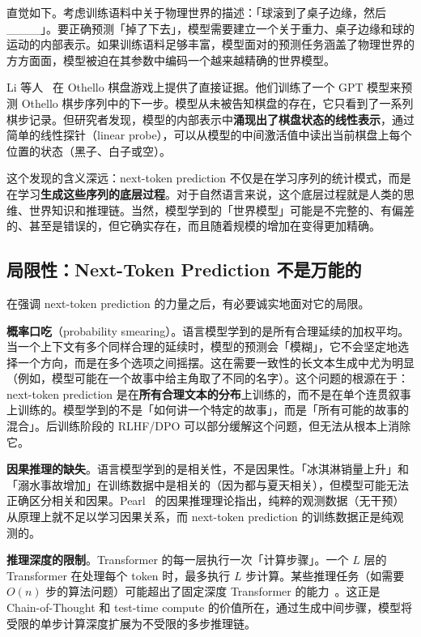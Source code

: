 直觉如下。考虑训练语料中关于物理世界的描述：「球滚到了桌子边缘，然后\_\_\_\_」。要正确预测「掉了下去」，模型需要建立一个关于重力、桌子边缘和球的运动的内部表示。如果训练语料足够丰富，模型面对的预测任务涵盖了物理世界的方方面面，模型被迫在其参数中编码一个越来越精确的世界模型。

Li 等人~\cite{li2023othello} 在 Othello 棋盘游戏上提供了直接证据。他们训练了一个 GPT 模型来预测 Othello 棋步序列中的下一步。模型从未被告知棋盘的存在，它只看到了一系列棋步记录。但研究者发现，模型的内部表示中\textbf{涌现出了棋盘状态的线性表示}，通过简单的线性探针（linear probe），可以从模型的中间激活值中读出当前棋盘上每个位置的状态（黑子、白子或空）。

这个发现的含义深远：next-token prediction 不仅是在学习序列的统计模式，而是在学习\textbf{生成这些序列的底层过程}。对于自然语言来说，这个底层过程就是人类的思维、世界知识和推理链。当然，模型学到的「世界模型」可能是不完整的、有偏差的、甚至是错误的，但它确实存在，而且随着规模的增加在变得更加精确。

\subsection{局限性：Next-Token Prediction 不是万能的}

在强调 next-token prediction 的力量之后，有必要诚实地面对它的局限。

\textbf{概率口吃}（probability smearing）。语言模型学到的是所有合理延续的加权平均。当一个上下文有多个同样合理的延续时，模型的预测会「模糊」，它不会坚定地选择一个方向，而是在多个选项之间摇摆。这在需要一致性的长文本生成中尤为明显（例如，模型可能在一个故事中给主角取了不同的名字）。这个问题的根源在于：next-token prediction 是在\textbf{所有合理文本的分布}上训练的，而不是在单个连贯叙事上训练的。模型学到的不是「如何讲一个特定的故事」，而是「所有可能的故事的混合」。后训练阶段的 RLHF/DPO 可以部分缓解这个问题，但无法从根本上消除它。

\textbf{因果推理的缺失}。语言模型学到的是相关性，不是因果性。「冰淇淋销量上升」和「溺水事故增加」在训练数据中是相关的（因为都与夏天相关），但模型可能无法正确区分相关和因果。Pearl~\cite{pearl2009causality} 的因果推理理论指出，纯粹的观测数据（无干预）从原理上就不足以学习因果关系，而 next-token prediction 的训练数据正是纯观测的。

\textbf{推理深度的限制}。Transformer 的每一层执行一次「计算步骤」。一个 $L$ 层的 Transformer 在处理每个 token 时，最多执行 $L$ 步计算。某些推理任务（如需要 $O(n)$ 步的算法问题）可能超出了固定深度 Transformer 的能力~\cite{merrill2023expressive}。这正是 Chain-of-Thought 和 test-time compute 的价值所在，通过生成中间步骤，模型将受限的单步计算深度扩展为不受限的多步推理链。


